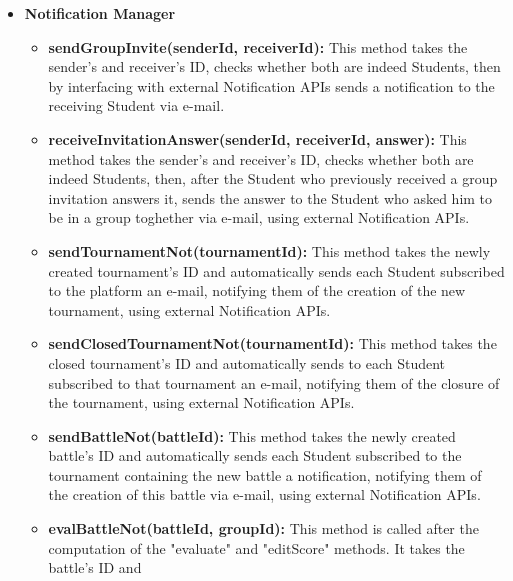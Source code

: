 \documentclass{article}
\begin{document}
{\begin{itemize}
\begin{itemize}
        This method will also be invoked when a battle is closed, so that badges will be granted also on the last commits made by each group.
        \item \textbf{getBadges(userId):} This methods takes the user's ID, checks if the user is a Student by interacting with the DBMS and, 
        if the user is indeed a Student, returns all the badges he achieved while using the platform.
        If the user is not a Student or an error occurs while interacting with the DBMS, an error page will be displayed.
    \end{itemize}
    \item \textbf{Notification Manager}
    \begin{itemize}
        \item \textbf{sendGroupInvite(senderId, receiverId):} This method takes the sender's and receiver's ID, checks whether both are indeed Students, then by interfacing 
        with external Notification APIs sends a notification to the receiving Student via e-mail.
        \item \textbf{receiveInvitationAnswer(senderId, receiverId, answer):} This method takes the sender's and receiver's ID, checks whether both are indeed Students, then,
        after the Student who previously received a group invitation answers it, sends the answer to the Student who asked him to be in a group toghether via e-mail, using
        external Notification APIs.
        \item \textbf{sendTournamentNot(tournamentId):} This method takes the newly created tournament's ID and automatically sends each Student subscribed to the platform an 
        e-mail, notifying them of the creation of the new tournament, using external Notification APIs. 
        \item \textbf{sendClosedTournamentNot(tournamentId):} This method takes the closed tournament's ID and automatically sends to each Student subscribed to that tournament
        an e-mail, notifying them of the closure of the tournament, using external Notification APIs.
        \item \textbf{sendBattleNot(battleId):} This method takes the newly created battle's ID and automatically sends each Student subscribed to the tournament containing the 
        new battle a notification, notifying them of the creation of this battle via e-mail, using external Notification APIs.
        \item \textbf{evalBattleNot(battleId, groupId):} This method is called after the computation of the "evaluate" and "editScore" methods. It takes the battle's ID and 

\end{itemize}
\end{itemize}}
\end{document}
